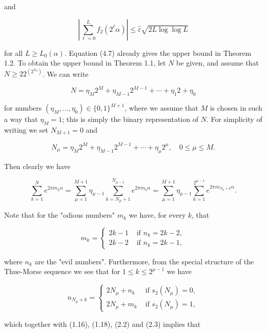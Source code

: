 \documentclass[10pt]{article}
\begin{document}
and


\begin{equation*}
\left|\sum_{\ell=0}^{L} f_{2}\left(2^{\ell} \alpha\right)\right| \leqslant \hat{\varepsilon} \sqrt{2 L \log \log L} \tag{4.8}
\end{equation*}


for all $L \geqslant L_{0}(\alpha)$. Equation (4.7) already gives the upper bound in Theorem 1.2. To obtain the upper bound in Theorem 1.1, let $N$ be given, and assume that $N \geqslant 22^{\left(2^{L_{0}}\right)}$. We can write

$$
N=\eta_{M} 2^{M}+\eta_{M-1} 2^{M-1}+\cdots+\eta_{1} 2+\eta_{0}
$$

for numbers $\left(\eta_{M}, \ldots, \eta_{0}\right) \in\{0,1\}^{M+1}$, where we assume that $M$ is chosen in such a way that $\eta_{M}=1$; this is simply the binary representation of $N$. For simplicity of writing we set $N_{M+1}=0$ and

$$
N_{\mu}=\eta_{M} 2^{M}+\eta_{M-1} 2^{M-1}+\cdots+\eta_{\mu} 2^{\mu}, \quad 0 \leqslant \mu \leqslant M .
$$

Then clearly we have


\begin{equation*}
\sum_{k=1}^{N} e^{2 \pi i n_{k} \alpha}=\sum_{\mu=1}^{M+1} \eta_{\mu-1} \sum_{k=N_{\mu}+1}^{N_{\mu-1}} e^{2 \pi i n_{k} \alpha}=\sum_{\mu=1}^{M+1} \eta_{\mu-1} \sum_{k=1}^{2^{\mu-1}} e^{2 \pi i n_{N_{\mu}+k} \alpha} . \tag{4.9}
\end{equation*}


Note that for the "odious numbers" $m_{k}$ we have, for every $k$, that

$$
m_{k}= \begin{cases}2 k-1 & \text { if } n_{k}=2 k-2, \\ 2 k-2 & \text { if } n_{k}=2 k-1,\end{cases}
$$

where $n_{k}$ are the "evil numbers". Furthermore, from the special structure of the Thue-Morse sequence we see that for $1 \leqslant k \leqslant 2^{\mu-1}$ we have

\[
n_{N_{\mu}+k}= \begin{cases}2 N_{\mu}+n_{k} & \text { if } s_{2}\left(N_{\mu}\right)=0,  \tag{4.10}\\ 2 N_{\mu}+m_{k} & \text { if } s_{2}\left(N_{\mu}\right)=1,\end{cases}
\]

which together with (1.16), (1.18), (2.2) and (2.3) implies that
\end{document}
